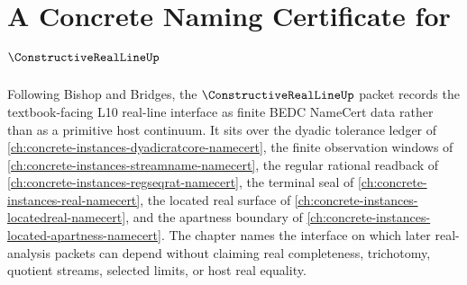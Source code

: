\chapter{A Concrete Naming Certificate for $\ConstructiveRealLineUp$}
\label{ch:concrete-instances-constructive-real-line-namecert}

Following Bishop and Bridges, the $\ConstructiveRealLineUp$ packet records the textbook-facing L10 real-line interface as finite BEDC NameCert data rather than as a primitive host continuum. It sits over the dyadic tolerance ledger of \autoref{ch:concrete-instances-dyadicratcore-namecert}, the finite observation windows of \autoref{ch:concrete-instances-streamname-namecert}, the regular rational readback of \autoref{ch:concrete-instances-regseqrat-namecert}, the terminal seal of \autoref{ch:concrete-instances-real-namecert}, the located real surface of \autoref{ch:concrete-instances-locatedreal-namecert}, and the apartness boundary of \autoref{ch:concrete-instances-located-apartness-namecert}. The chapter names the interface on which later real-analysis packets can depend without claiming real completeness, trichotomy, quotient streams, selected limits, or host real equality.

